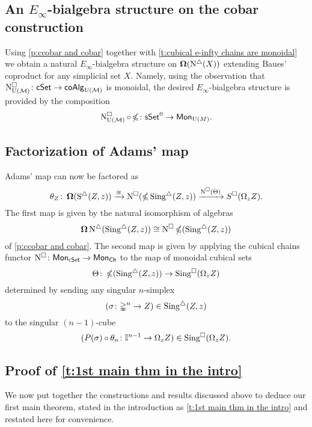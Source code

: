 \subsection{An $E_{\infty}$-bialgebra structure on the cobar construction} \label{ss:e-infty on cobar}

Using \cref{p:ccobar and cobar} together with \cref{t:cubical e-infty chains are monoidal} we obtain a natural $E_{\infty}$-bialgebra structure on $\operatorname{\mathbf{\Omega}}(\operatorname{N^{\triangle}}(X))$ extending Baues' coproduct for any simplicial set $X$.
Namely, using the observation that $\operatorname{N^{\square}_{{\operatorname{U}(\mathcal{M})}}} \colon \mathsf{cSet} \to \mathsf{coAlg}_{{\operatorname{U}(\mathcal{M})}}$ is monoidal, the desired $E_{\infty}$-bialgebra structure is provided by the composition 
$$\operatorname{N^{\square}_{{\operatorname{U}(\mathcal{M})}}} \circ \operatorname{\mathbb{\Omega}} \colon \mathsf{sSet}^0 \to \mathsf{Mon}_{\operatorname{U}(M)}.$$

\subsection{Factorization of Adams' map} \label{factorization}

Adams' map can now be factored as 
$$\theta_Z \colon \operatorname{\mathbf{\Omega}}(\operatorname{S^{\triangle}}(Z, z)) \xrightarrow{\cong} 
\operatorname{N^{\square}}(\operatorname{\mathbb{\Omega}} \operatorname{Sing^{\triangle}}(Z, z)) \xrightarrow{\operatorname{N^{\square}}(\Theta)} 
S^{\square}(\Omega_z Z).$$
The first map is given by the natural isomorphism of algebras $$\operatorname{\mathbf{\Omega}} \operatorname{N^{\triangle}} (\operatorname{Sing^{\triangle}}(Z, z)) \cong  \operatorname{N^{\square}} \operatorname{\mathbb{\Omega}} (\operatorname{Sing^{\triangle}}(Z, z))$$ of \cref{p:ccobar and cobar}.
The second map is given by applying the cubical chains functor $\operatorname{N^{\square}} \colon \mathsf{Mon}_{\mathsf{cSet}} \to \mathsf{Mon}_{\mathsf{Ch}}$ to the map of monoidal cubical sets
$$\Theta \colon \operatorname{\mathbb{\Omega}} (\operatorname{Sing^{\triangle}}(Z, z) )\to \operatorname{Sing^{\square}}( \Omega_z Z)$$
determined by sending any singular $n$-simplex $$(\sigma\colon \mathbb{\Delta}^n \to Z) \in \operatorname{Sing^{\triangle}}(Z, z)$$ to the singular $(n-1)$-cube $$(P(\sigma) \circ \theta_n \colon \mathbb{I}^{n-1} \to \Omega_z Z) \in \operatorname{Sing^{\square}}( \Omega_z Z).$$ 

\subsection{Proof of \cref{t:1st main thm in the intro}}

We now put together the constructions and results discussed above to deduce our first main theorem, stated in the introduction as \cref{t:1st main thm in the intro} and restated here for convenience.

